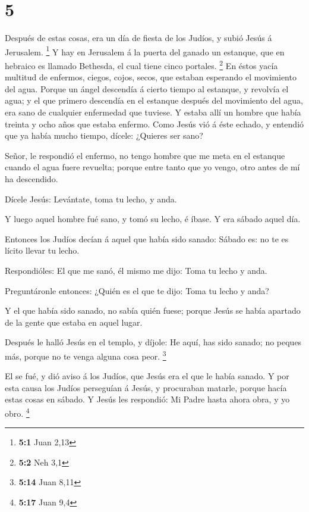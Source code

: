 \hypertarget{section-4}{%
\section{5}\label{section-4}}

 Después de estas cosas, era un día de fiesta de los Judíos,
y subió Jesús á Jerusalem. \footnote{\textbf{5:1} Juan 2,13}
 Y hay en Jerusalem á la puerta del ganado un estanque, que
en hebraico es llamado Bethesda, el cual tiene cinco portales.
\footnote{\textbf{5:2} Neh 3,1}  En éstos yacía multitud de
enfermos, ciegos, cojos, secos, que estaban esperando el movimiento del
agua.  Porque un ángel descendía á cierto tiempo al
estanque, y revolvía el agua; y el que primero descendía en el estanque
después del movimiento del agua, era sano de cualquier enfermedad que
tuviese.  Y estaba allí un hombre que había treinta y ocho
años que estaba enfermo.  Como Jesús vió á éste echado, y
entendió que ya había mucho tiempo, dícele: ¿Quieres ser sano?

 Señor, le respondió el enfermo, no tengo hombre que me meta
en el estanque cuando el agua fuere revuelta; porque entre tanto que yo
vengo, otro antes de mí ha descendido.

 Dícele Jesús: Levántate, toma tu lecho, y anda.

 Y luego aquel hombre fué sano, y tomó su lecho, é íbase. Y
era sábado aquel día.

 Entonces los Judíos decían á aquel que había sido sanado:
Sábado es: no te es lícito llevar tu lecho.

 Respondióles: El que me sanó, él mismo me dijo: Toma tu
lecho y anda.

 Preguntáronle entonces: ¿Quién es el que te dijo: Toma tu
lecho y anda?

 Y el que había sido sanado, no sabía quién fuese; porque
Jesús se había apartado de la gente que estaba en aquel lugar.

 Después le halló Jesús en el templo, y díjole: He aquí,
has sido sanado; no peques más, porque no te venga alguna cosa peor.
\footnote{\textbf{5:14} Juan 8,11}

 El se fué, y dió aviso á los Judíos, que Jesús era el que
le había sanado.  Y por esta causa los Judíos perseguían á
Jesús, y procuraban matarle, porque hacía estas cosas en sábado.
 Y Jesús les respondió: Mi Padre hasta ahora obra, y yo
obro. \footnote{\textbf{5:17} Juan 9,4}

